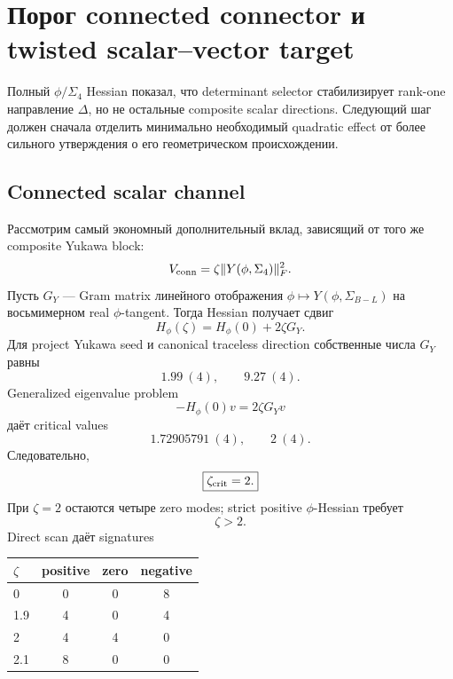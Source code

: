 \section{Порог connected connector и twisted scalar--vector target}

Полный \(\phi/\Sigma_4\) Hessian показал, что determinant selector
стабилизирует rank-one направление \(\Delta\), но не остальные composite
scalar directions. Следующий шаг должен сначала отделить минимально
необходимый quadratic effect от более сильного утверждения о его
геометрическом происхождении.

\subsection{Connected scalar channel}

Рассмотрим самый экономный дополнительный вклад, зависящий от того же
composite Yukawa block:
\begin{equation}
 V_{\rm conn}=\zeta\|Y(\phi,\Sigma_4)\|_F^2.
 \label{eq:ps-connected-scalar-channel}
\end{equation}
Пусть \(G_Y\) --- Gram matrix линейного отображения
\(\phi\mapsto Y(\phi,\Sigma_{B-L})\) на восьмимерном real
\(\phi\)-tangent. Тогда Hessian получает сдвиг
\begin{equation}
 H_\phi(\zeta)=H_\phi(0)+2\zeta G_Y.
\end{equation}
Для project Yukawa seed и canonical traceless direction собственные числа
\(G_Y\) равны
\begin{equation}
 1.99\ (4),
 \qquad
 9.27\ (4).
\end{equation}
Generalized eigenvalue problem
\begin{equation}
 -H_\phi(0)v=2\zeta G_Yv
\end{equation}
даёт critical values
\begin{equation}
 1.72905791\ (4),
 \qquad
 2\ (4).
\end{equation}
Следовательно,
\begin{equation}
 \boxed{\zeta_{\rm crit}=2.}
 \label{eq:ps-connector-critical-zeta}
\end{equation}
При \(\zeta=2\) остаются четыре zero modes; strict positive
\(\phi\)-Hessian требует
\begin{equation}
 \boxed{\zeta>2.}
 \label{eq:ps-connector-strict-threshold}
\end{equation}
Direct scan даёт signatures
\begin{center}
\begin{tabular}{lccc}
\toprule
\(\zeta\) & positive & zero & negative\\
\midrule
0 & 0 & 0 & 8\\
1.9 & 4 & 0 & 4\\
2 & 4 & 4 & 0\\
2.1 & 8 & 0 & 0\\
\bottomrule
\end{tabular}
\end{center}

